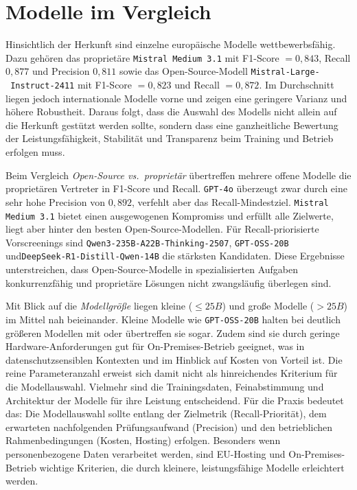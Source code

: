 \section{Modelle im Vergleich}\label{sec:modelle-im-vergleich}

Hinsichtlich der Herkunft sind einzelne europäische Modelle wettbewerbsfähig. Dazu gehören das proprietäre \texttt{Mistral Medium 3.1} mit F1-Score $= 0{,}843$, Recall $0{,}877$ und Precision $0{,}811$ sowie das Open-Source-Modell \texttt{Mistral-Large-\linebreak~Instruct-2411} mit F1-Score $= 0{,}823$ und Recall $= 0{,}872$. Im Durchschnitt liegen jedoch internationale Modelle vorne und zeigen eine geringere Varianz und höhere Robustheit. Daraus folgt, dass die Auswahl des Modells nicht allein auf die Herkunft gestützt werden sollte, sondern dass eine ganzheitliche Bewertung der Leistungsfähigkeit, Stabilität und Transparenz beim Training und Betrieb erfolgen muss.

Beim Vergleich \emph{Open-Source vs.\ proprietär} übertreffen mehrere offene Modelle die proprietären Vertreter in F1-Score und Recall. \texttt{GPT-4o} überzeugt zwar durch eine sehr hohe Precision von $0{,}892$, verfehlt aber das Recall-Mindestziel. \texttt{Mistral Medium 3.1} bietet einen ausgewogenen Kompromiss und erfüllt alle Zielwerte, liegt aber hinter den besten Open-Source-Modellen. Für Recall-priorisierte Vorscreenings sind \texttt{Qwen3-235B-A22B-Thinking-2507}, \texttt{GPT-OSS-20B} und\linebreak\texttt{DeepSeek-R1-Distill-Qwen-14B} die stärksten Kandidaten. Diese Ergebnisse unterstreichen, dass Open-Source-Modelle in spezialisierten Aufgaben konkurrenzfähig und proprietäre Lösungen nicht zwangsläufig überlegen sind.

Mit Blick auf die \emph{Modellgröße} liegen kleine ($\leq 25B$) und große Modelle ($> 25B$) im Mittel nah beieinander. Kleine Modelle wie \texttt{GPT-OSS-20B} halten bei deutlich größeren Modellen mit oder übertreffen sie sogar. Zudem sind sie durch geringe Hardware-Anforderungen gut für On-Premises-Betrieb geeignet, was in datenschutzsensiblen Kontexten und im Hinblick auf Kosten von Vorteil ist. Die reine Parameteranzahl erweist sich damit nicht als hinreichendes Kriterium für die Modellauswahl. Vielmehr sind die Trainingsdaten, Feinabstimmung und Architektur der Modelle für ihre Leistung entscheidend. Für die Praxis bedeutet das: Die Modellauswahl sollte entlang der Zielmetrik (Recall-Priorität), dem erwarteten nachfolgenden Prüfungsaufwand (Precision) und den betrieblichen Rahmenbedingungen (Kosten, Hosting) erfolgen. Besonders wenn personenbezogene Daten verarbeitet werden, sind \ac{EU}-Hosting und On-Premises-Betrieb wichtige Kriterien, die durch kleinere, leistungsfähige Modelle erleichtert werden.